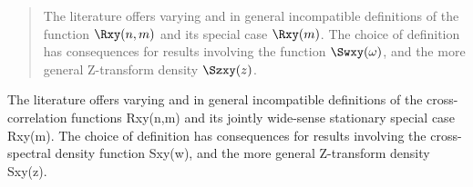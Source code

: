 \begin{abstract}
The literature offers varying and in general incompatible definitions of the
 function $\Rxy(n,m)$ and its  special case $\Rxy(m)$.
The choice of definition has consequences for results involving the  function 
$\Swxy(\omega)$, and the more general Z-transform density $\Szxy(z)$.
\end{abstract}

The literature offers varying and in general incompatible definitions of the cross-correlation functions Rxy(n,m) and its jointly wide-sense stationary special case Rxy(m). The choice of definition has consequences for results involving the cross-spectral density function Sxy(w), and the more general Z-transform density Sxy(z).
%

